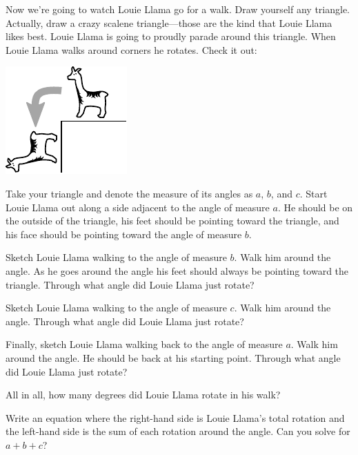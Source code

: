 \documentclass{ximera}
\begin{document}
Now we're going to watch Louie Llama go for a walk. Draw yourself any
triangle.  Actually, draw a crazy scalene triangle---those are the kind that Louie
Llama likes best. Louie Llama is going to proudly parade around this
triangle. When Louie Llama walks around corners he rotates. Check
it out:
\begin{image}
\includegraphics{llamaCorner.pdf}
\end{image}
Take your triangle and denote the measure of its angles as $a$, $b$,
and $c$. Start Louie Llama out along a side adjacent to the angle of
measure $a$. He should be on the outside of the triangle, his feet
should be pointing toward the triangle, and his face should be
pointing toward the angle of measure $b$.
\begin{question} 
Sketch Louie Llama walking to the angle of measure $b$. Walk him
around the angle. As he goes around the angle his feet should always
be pointing toward the triangle. Through what angle did Louie Llama
just rotate?
\end{question}

\begin{question}
Sketch Louie Llama walking to the angle of measure $c$. Walk him
around the angle. Through what angle did Louie Llama just rotate?
\end{question}

\begin{question}
Finally, sketch Louie Llama walking back to the angle of measure
$a$. Walk him around the angle. He should be back at his starting
point. Through what angle did Louie Llama just rotate?
\end{question}

\begin{question} 
All in all, how many degrees did Louie Llama rotate in his walk?
\end{question}

\begin{question} 
Write an equation where the right-hand side is Louie Llama's total
rotation and the left-hand side is the sum of each rotation around the
angle. Can you solve for $a+b+c$?
\end{question}
\end{document}
